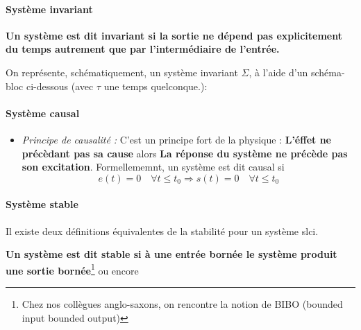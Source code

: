 \paragraph{Système invariant}
\textbf{Un système est dit invariant si la sortie ne dépend pas 
explicitement du temps autrement que par l'intermédiaire de l'entrée.}

On représente, schématiquement, un système invariant $\Sigma$, à 
l'aide d'un schéma-bloc ci-dessous 
(avec $\tau$ une temps quelconque.): 
\begin{center}
    
\end{center}

\paragraph{Système causal}
\begin{itemize}
    \item \emph{Principe de causalité :}
        C'est un principe fort de la physique :
        \textbf{\og L'éffet ne précèdant pas sa cause\fg} alors 
        \textbf{\og La réponse du système ne précède pas son excitation\fg}.
        Formellememnt, un système est dit causal si 
        $$e(t)=0\quad\forall t\le t_0 \Rightarrow s(t)=0\quad\forall t\le t_0$$
\end{itemize}

\paragraph{Système stable}
Il existe deux définitions équivalentes de la stabilité pour un 
système \gls{slci}.

\textbf{Un système est dit stable si à une entrée bornée le système 
produit une sortie bornée}\footnote{Chez nos collègues anglo-saxons, on 
rencontre la notion de BIBO (\og bounded input bounded output\fg)}
ou encore

